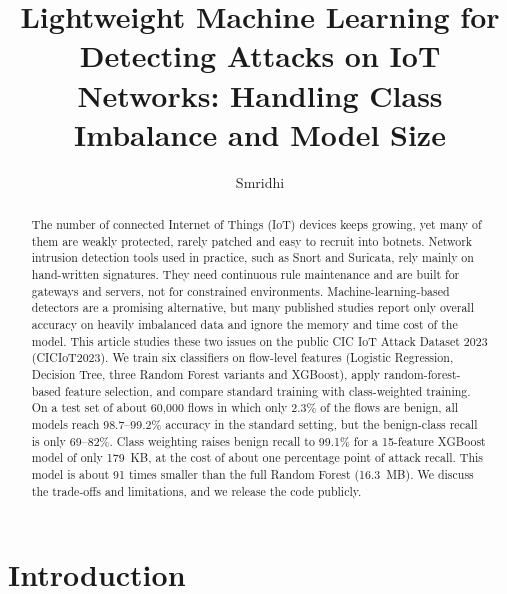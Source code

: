 \documentclass[runningheads]{llncs}
\begin{document}
\title{Lightweight Machine Learning for Detecting Attacks on IoT Networks: Handling Class Imbalance and Model Size}

\author{Smridhi}

\maketitle

\begin{abstract}
The number of connected Internet of Things (IoT) devices keeps growing, yet many of them are weakly protected, rarely patched and easy to recruit into botnets. Network intrusion detection tools used in practice, such as Snort and Suricata, rely mainly on hand-written signatures. They need continuous rule maintenance and are built for gateways and servers, not for constrained environments. Machine-learning-based detectors are a promising alternative, but many published studies report only overall accuracy on heavily imbalanced data and ignore the memory and time cost of the model. This article studies these two issues on the public CIC IoT Attack Dataset 2023 (CICIoT2023). We train six classifiers on flow-level features (Logistic Regression, Decision Tree, three Random Forest variants and XGBoost), apply random-forest-based feature selection, and compare standard training with class-weighted training. On a test set of about 60,000 flows in which only 2.3\% of the flows are benign, all models reach 98.7--99.2\% accuracy in the standard setting, but the benign-class recall is only 69--82\%. Class weighting raises benign recall to 99.1\% for a 15-feature XGBoost model of only 179~KB, at the cost of about one percentage point of attack recall. This model is about 91 times smaller than the full Random Forest (16.3~MB). We discuss the trade-offs and limitations, and we release the code publicly.
\end{abstract}

\section{Introduction}
\label{sec:intro}
\end{document}
